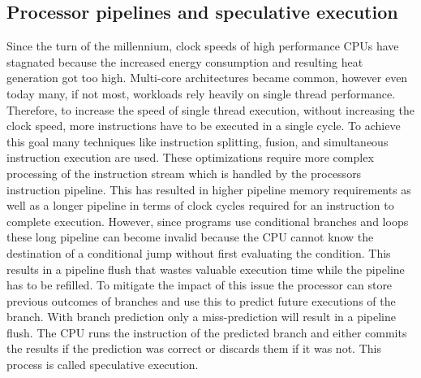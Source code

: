 \documentclass[conference,compsoc,final,a4paper]{IEEEtran}
\begin{document}
\subsection{Processor pipelines and speculative execution}
Since the turn of the millennium, clock speeds of high performance CPUs have stagnated because the increased energy consumption and resulting heat generation got too high. \cite{fog2012microarchitecture} Multi-core architectures became common, however even today many, if not most, workloads rely heavily on single thread performance. Therefore, to increase the speed of single thread execution, without increasing the clock speed, more instructions have to be executed in a single cycle. To achieve this goal many techniques like instruction splitting, fusion, and simultaneous instruction execution are used. \cite{fog2012microarchitecture} These optimizations require more complex processing of the instruction stream which is handled by the processors instruction pipeline. This has resulted in higher pipeline memory requirements as well as a longer pipeline in terms of clock cycles required for an instruction to complete execution. However, since programs use conditional branches and loops these long pipeline can become invalid because the CPU cannot know the destination of a conditional jump without first evaluating the condition. This results in a pipeline flush that wastes valuable execution time while the pipeline has to be refilled. To mitigate the impact of this issue the processor can store previous outcomes of branches and use this to predict future executions of the branch. With branch prediction only a miss-prediction will result in a pipeline flush. The CPU runs the instruction of the predicted branch and either commits the results if the prediction was correct or discards them if it was not. This process is called speculative execution. \cite{kocher2018spectre}
\end{document}
